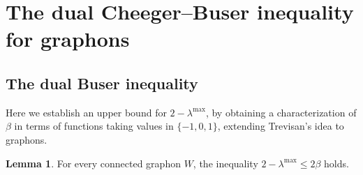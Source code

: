 \documentclass[12pt,a4paper,bold]{thesis}
\theoremstyle{definition}
\newtheorem{lemma}[thm]{Lemma}
\begin{document}
\section[The dual Cheeger--Buser inequality for graphons]
{The dual Cheeger--Buser inequality for graphons
} \label{section:CBIneq}

\subsection{The dual Buser inequality}

Here we establish an upper bound for $2 - \lambda^{\max}$, by obtaining a characterization 
of $\beta$ in terms of functions taking values in $\{-1,0,1\}$, 
extending Trevisan's idea to graphons.

\begin{lemma} \label{lemma:buser}
    For every connected graphon $W$, the inequality $2 - \lambda^{\max} \leq 2 \beta$ holds.
\end{lemma}
\end{document}
